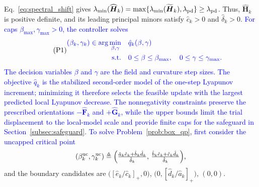\documentclass[journal]{IEEEtran}
\theoremstyle{remark}
\newcommand{\bH}{\boldsymbol{H}}
\newcommand{\hatF}{\widehat{\boldsymbol{F}}}
\newcommand{\hatG}{\widehat{\boldsymbol{G}}}
\begin{document}
	Eq.~\eqref{eq:spectral_shift} gives $\lambda_{\min}(\widehat{\bH}_k)=\max\{\lambda_{\min}(\widetilde{\bH}_k),\lambda_{\rm pd}\}\ge\lambda_{\rm pd}$.
	Thus, $\widehat{\bH}_k$ is positive definite, and its leading principal minors satisfy $\hat c_k>0$ and $\hat\delta_k>0$.
	\textcolor{blue}{For caps $\beta_{\max},\gamma_{\max}>0$, the controller solves}
	\begin{equation*}\tag{P1}\label{prob:box_qp}
		\textcolor{blue}{
		\begin{aligned}
		(\beta_k,\gamma_k)\in
		\arg\min_{\beta,\gamma}\quad &\hat q_k(\beta,\gamma)\\
		\mathrm{s.t.}\quad &0\le\beta\le\beta_{\max},\quad
		0\le\gamma\le\gamma_{\max}.
		\end{aligned}}
	\end{equation*}
	\textcolor{blue}{The decision variables $\beta$ and $\gamma$ are the field and curvature step sizes. The objective $\hat q_k$ is the stabilized second-order model of the one-step Lyapunov increment; minimizing it therefore selects the feasible update with the largest predicted local Lyapunov decrease. The nonnegativity constraints preserve the prescribed orientations $-\hatF_k$ and $+\hatG_k$, while the upper bounds limit the trial displacement to the local-model scale and provide finite caps for the safeguard in Section~\ref{subsec:safeguard}. To solve Problem~\eqref{prob:box_qp}, first consider the uncapped critical point}
	\begin{equation}\label{eq:unconstrained_pair}
		(\beta_{k}^{\rm uc},\gamma_{k}^{\rm uc})
		\triangleq
		\Bigl(\tfrac{\hat a_{k}\hat e_{k}+\hat b_{k}\hat d_{k}}{\hat\delta_{k}},\,
		\tfrac{\hat b_{k}\hat e_{k}+\hat c_{k}\hat d_{k}}{\hat\delta_{k}}\Bigr),
	\end{equation}
	and the boundary candidates are $\bigl([\hat e_{k}/\hat c_{k}]_{+},0\bigr)$, $\bigl(0,[\hat d_{k}/\hat a_{k}]_{+}\bigr)$, $(0,0)$.
	
\end{document}
